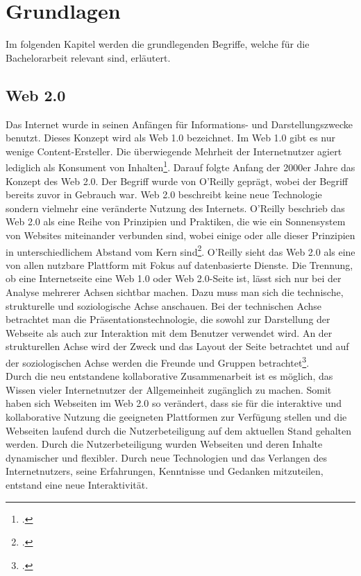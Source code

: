 \chapter{Grundlagen}
\label{ch:Grundlagen}

Im folgenden Kapitel werden die grundlegenden Begriffe, welche für die Bachelorarbeit relevant sind, erläutert. 

\section{Web 2.0}
\label{web2.0}

Das Internet wurde in seinen Anfängen für Informations- und Darstellungszwecke benutzt. Dieses Konzept wird als Web 1.0 bezeichnet. Im Web 1.0 gibt es nur wenige Content-Ersteller. Die überwiegende Mehrheit der Internetnutzer agiert lediglich als Konsument von Inhalten\footcite{unterschiedWeb1u2}. Darauf folgte Anfang der 2000er Jahre das Konzept des Web 2.0. Der Begriff wurde von O'Reilly geprägt, wobei der Begriff bereits zuvor in Gebrauch war. Web 2.0 beschreibt keine neue Technologie sondern vielmehr eine veränderte Nutzung des Internets. O'Reilly beschrieb das Web 2.0 als eine Reihe von Prinzipien und Praktiken, die wie ein Sonnensystem von Websites miteinander verbunden sind, wobei einige oder alle dieser Prinzipien in unterschiedlichem Abstand vom Kern sind\footcite{oreilly}. O'Reilly sieht das Web 2.0 als eine von allen nutzbare Plattform mit Fokus auf datenbasierte Dienste.
Die Trennung, ob eine Internetseite eine Web 1.0 oder Web 2.0-Seite ist, lässt sich nur bei der Analyse mehrerer Achsen sichtbar machen. Dazu muss man sich die technische, strukturelle und soziologische Achse anschauen. Bei der technischen Achse betrachtet man die Präsentationstechnologie, die sowohl zur Darstellung der Webseite als auch zur Interaktion mit dem Benutzer verwendet wird. An der strukturellen Achse wird der Zweck und das Layout der Seite betrachtet und auf der soziologischen Achse werden die Freunde und Gruppen betrachtet\footcite{unterschiedWeb1u2}. \\
Durch die neu entstandene kollaborative Zusammenarbeit ist es möglich, das Wissen vieler Internetnutzer der Allgemeinheit zugänglich zu machen. Somit haben sich Webseiten im Web 2.0 so verändert, dass sie für die interaktive und kollaborative Nutzung die geeigneten Plattformen zur Verfügung stellen und die Webseiten laufend durch die Nutzerbeteiligung auf dem aktuellen Stand gehalten werden. Durch die Nutzerbeteiligung wurden Webseiten und deren Inhalte dynamischer und flexibler.
Durch neue Technologien und das Verlangen des Internetnutzers, seine Erfahrungen, Kenntnisse und Gedanken mitzuteilen, entstand eine neue Interaktivität.


